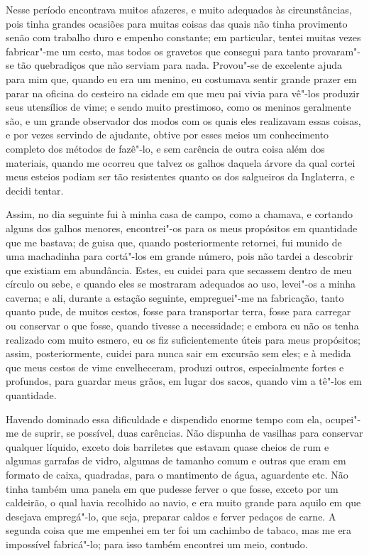 Nesse período encontrava muitos afazeres, e muito adequados às
circunstâncias, pois tinha grandes ocasiões para muitas coisas das quais
não tinha provimento senão com trabalho duro e empenho constante; em
particular, tentei muitas vezes fabricar"-me um cesto, mas todos os
gravetos que consegui para tanto provaram"-se tão quebradiços que não
serviam para nada. Provou"-se de excelente ajuda para mim que, quando eu
era um menino, eu costumava sentir grande prazer em parar na oficina do
cesteiro na cidade em que meu pai vivia para vê"-los produzir seus
utensílios de vime; e sendo muito prestimoso, como os meninos geralmente
são, e um grande observador dos modos com os quais eles realizavam essas
coisas, e por vezes servindo de ajudante, obtive por esses meios um
conhecimento completo dos métodos de fazê"-lo, e sem carência de outra
coisa além dos materiais, quando me ocorreu que talvez os galhos daquela
árvore da qual cortei meus esteios podiam ser tão resistentes quanto os
dos salgueiros da Inglaterra, e decidi tentar.

Assim, no dia seguinte fui à minha casa de campo, como a chamava, e
cortando alguns dos galhos menores, encontrei"-os para os meus propósitos
em quantidade que me bastava; de guisa que, quando posteriormente
retornei, fui munido de uma machadinha para cortá"-los em grande número,
pois não tardei a descobrir que existiam em abundância. Estes, eu cuidei
para que secassem dentro de meu círculo ou sebe, e quando eles se
mostraram adequados ao uso, levei"-os a minha caverna; e ali, durante a
estação seguinte, empreguei"-me na fabricação, tanto quanto pude, de
muitos cestos, fosse para transportar terra, fosse para carregar ou
conservar o que fosse, quando tivesse a necessidade; e embora eu não os
tenha realizado com muito esmero, eu os fiz suficientemente úteis para
meus propósitos; assim, posteriormente, cuidei para nunca sair em
excursão sem eles; e à medida que meus cestos de vime envelheceram,
produzi outros, especialmente fortes e profundos, para guardar meus
grãos, em lugar dos sacos, quando vim a tê"-los em quantidade.

Havendo dominado essa dificuldade e dispendido enorme tempo com ela,
ocupei"-me de suprir, se possível, duas carências. Não dispunha de
vasilhas para conservar qualquer líquido, exceto dois barriletes que
estavam quase cheios de rum e algumas garrafas de vidro, algumas de
tamanho comum e outras que eram em formato de caixa, quadradas, para o
mantimento de água, aguardente etc. Não tinha também uma panela em que
pudesse ferver o que fosse, exceto por um caldeirão, o qual havia
recolhido ao navio, e era muito grande para aquilo em que desejava
empregá"-lo, que seja, preparar caldos e ferver pedaços de carne. A
segunda coisa que me empenhei em ter foi um cachimbo de tabaco, mas me
era impossível fabricá"-lo; para isso também encontrei um meio, contudo.

